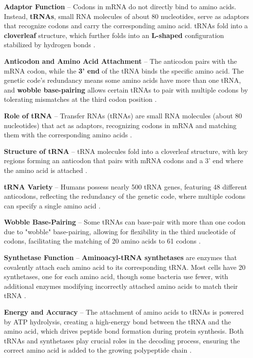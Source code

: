 \textbf{Adaptor Function} – Codons in mRNA do not directly bind to amino acids. Instead, \textbf{tRNAs}, small RNA molecules of about 80 nucleotides, serve as adaptors that recognize codons and carry the corresponding amino acid. tRNAs fold into a \textbf{cloverleaf} structure, which further folds into an \textbf{L-shaped} configuration stabilized by hydrogen bonds \cite*{L1-Chapter6}.

\textbf{Anticodon and Amino Acid Attachment} – The anticodon pairs with the mRNA codon, while the \textbf{3' end} of the tRNA binds the specific amino acid. The genetic code's redundancy means some amino acids have more than one tRNA, and \textbf{wobble base-pairing} allows certain tRNAs to pair with multiple codons by tolerating mismatches at the third codon position \cite*{L1-Chapter6}.

\textbf{Role of tRNA} – Transfer RNAs (tRNAs) are small RNA molecules (about 80 nucleotides) that act as adaptors, recognizing codons in mRNA and matching them with the corresponding amino acids \cite*{L1-Chapter6}.

\textbf{Structure of tRNA} – tRNA molecules fold into a cloverleaf structure, with key regions forming an anticodon that pairs with mRNA codons and a 3' end where the amino acid is attached \cite*{L1-Chapter6}.

\textbf{tRNA Variety} – Humans possess nearly 500 tRNA genes, featuring 48 different anticodons, reflecting the redundancy of the genetic code, where multiple codons can specify a single amino acid \cite*{L1-Chapter6}.

\textbf{Wobble Base-Pairing} – Some tRNAs can base-pair with more than one codon due to "wobble" base-pairing, allowing for flexibility in the third nucleotide of codons, facilitating the matching of 20 amino acids to 61 codons \cite*{L1-Chapter6}.

\textbf{Synthetase Function} – \textbf{Aminoacyl-tRNA synthetases} are enzymes that covalently attach each amino acid to its corresponding tRNA. Most cells have 20 synthetases, one for each amino acid, though some bacteria use fewer, with additional enzymes modifying incorrectly attached amino acids to match their tRNA \cite*{L1-Chapter6}.

\textbf{Energy and Accuracy} – The attachment of amino acids to tRNAs is powered by ATP hydrolysis, creating a high-energy bond between the tRNA and the amino acid, which drives peptide bond formation during protein synthesis. Both tRNAs and synthetases play crucial roles in the decoding process, ensuring the correct amino acid is added to the growing polypeptide chain \cite*{L1-Chapter6}.

